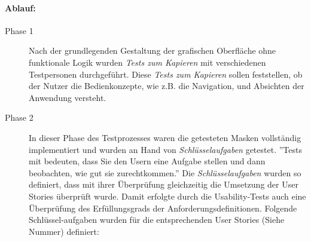 \paragraph*{Ablauf:}
\begin{description}

        \item[Phase 1] Nach der grundlegenden Gestaltung der grafischen Oberfläche ohne funktionale Logik wurden \textit{Tests zum Kapieren} mit verschiedenen Testpersonen durchgeführt. Diese \textit{Tests zum Kapieren} sollen feststellen, ob der Nutzer die Bedienkonzepte, wie z.B. die Navigation, und Absichten der Anwendung versteht\cite[Vgl. S. 144]{Usability}.

        \item[Phase 2] In dieser Phase des Testprozesses waren die getesteten Masken vollständig implementiert und wurden an Hand von \textit{Schlüsselaufgaben} getestet. ''Tests mit bedeuten, dass Sie den Usern eine Aufgabe stellen und dann beobachten, wie gut sie zurechtkommen\cite[Vgl. S. 144]{Usability}.'' Die \textit{Schlüsselaufgaben} wurden so definiert, dass mit ihrer Überprüfung gleichzeitig die Umsetzung der User Stories überprüft wurde. Damit erfolgte durch die Usability-Tests auch eine Überprüfung des Erfüllungsgrads der Anforderungsdefinitionen. Folgende Schlüssel-aufgaben wurden für die entsprechenden User Stories (Siehe Nummer) definiert:


\end{description}
